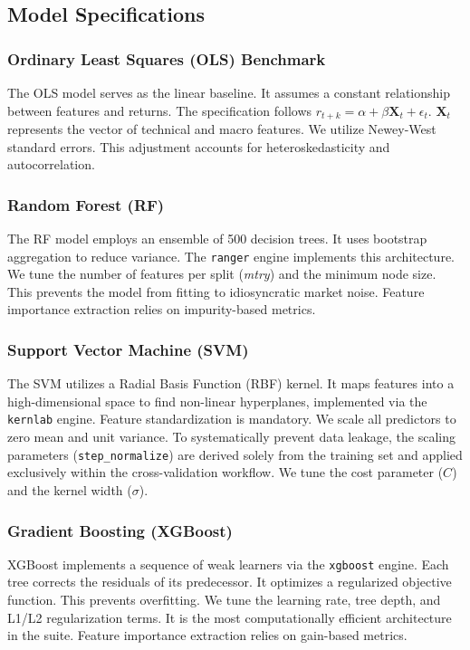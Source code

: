 \documentclass[12pt]{article}
\begin{document}
\subsection{Model Specifications}

\subsubsection{Ordinary Least Squares (OLS) Benchmark}
The OLS model serves as the linear baseline. It assumes a constant relationship between features and returns. The specification follows $r_{t+k} = \alpha + \beta \mathbf{X}_t + \epsilon_t$. $\mathbf{X}_t$ represents the vector of technical and macro features. We utilize Newey-West standard errors. This adjustment accounts for heteroskedasticity and autocorrelation.

\subsubsection{Random Forest (RF)}
The RF model employs an ensemble of 500 decision trees. It uses bootstrap aggregation to reduce variance. The \texttt{ranger} engine implements this architecture. We tune the number of features per split (\textit{mtry}) and the minimum node size. This prevents the model from fitting to idiosyncratic market noise. Feature importance extraction relies on impurity-based metrics.

\subsubsection{Support Vector Machine (SVM)}
The SVM utilizes a Radial Basis Function (RBF) kernel. It maps features into a high-dimensional space to find non-linear hyperplanes, implemented via the \texttt{kernlab} engine. Feature standardization is mandatory. We scale all predictors to zero mean and unit variance. To systematically prevent data leakage, the scaling parameters (\texttt{step\_normalize}) are derived solely from the training set and applied exclusively within the cross-validation workflow. We tune the cost parameter ($C$) and the kernel width ($\sigma$).

\subsubsection{Gradient Boosting (XGBoost)}
XGBoost implements a sequence of weak learners via the \texttt{xgboost} engine. Each tree corrects the residuals of its predecessor. It optimizes a regularized objective function. This prevents overfitting. We tune the learning rate, tree depth, and L1/L2 regularization terms. It is the most computationally efficient architecture in the suite. Feature importance extraction relies on gain-based metrics.
\end{document}
